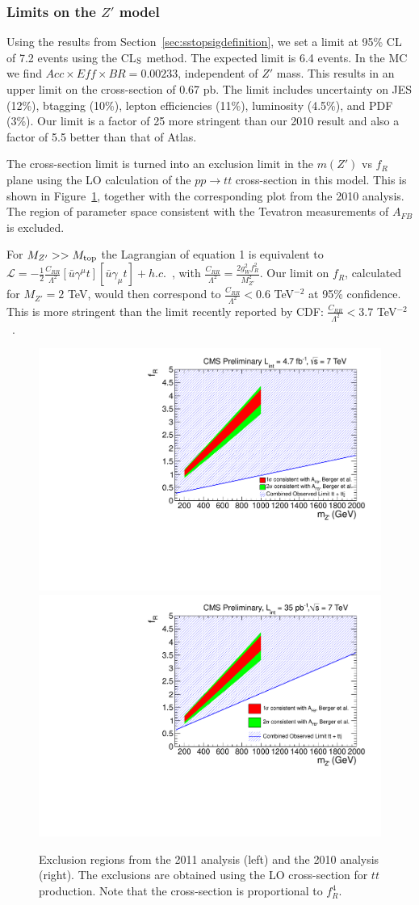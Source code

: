 \subsubsection{Limits on the $Z'$ model}
\label{sec:sstopslimits}
Using the results from Section~\ref{sec:sstopsigdefinition}, we set 
a limit at 95\% CL of 7.2 events using the CL$_{\rm S}$ method.
The expected limit is 6.4 events.
In the MC we find $Acc \times Eff \times BR = 0.00233$, independent of $Z'$ mass. 
This results in an upper limit on the cross-section of 0.67 pb.
The limit includes uncertainty
on JES (12\%), btagging (10\%), lepton efficiencies (11\%), luminosity (4.5\%),
and PDF (3\%).
Our limit is a factor of 25 more stringent than our
2010 result\cite{sstop} and also a factor of 5.5 better
than that of Atlas\cite{sstopatlas}.

The cross-section limit is turned into an exclusion limit in the $m(Z')$ vs $f_R$
plane using the LO calculation of the $pp \to tt$ cross-section in this model.
This is shown in Figure~\ref{fig:sstopexclusion}, together with the corresponding
plot from the 2010 analysis.  The region of parameter space consistent 
with the Tevatron measurements of $A_{FB}$ is excluded.


For $M_{Z'} >> M_{\rm top}$ the Lagrangian of equation 1 is 
equivalent to 
$\mathcal{L} = -\frac{1}{2}\frac{C_{RR}}{\Lambda^2}
 [\bar{u} \gamma^\mu t][\bar{u} \gamma_{\mu} t] + h.c.$~\cite{cdfth2},
with $\frac{C_{RR}}{\Lambda^2} = \frac{2 g_W^2 f_R^2}{M_{Z'}^2}$.
 Our limit on $f_R$, calculated for $M_{Z'}=2$ TeV, 
would then correspond to $\frac{C_{RR}}{\Lambda^2} < 0.6$ TeV$^{-2}$ at 
95\% confidence.  This is more stringent than the limit recently reported
by CDF: $\frac{C_{RR}}{\Lambda^2} < 3.7$ TeV$^{-2}$~\cite{cdflimit}.


\begin{figure}[htb]
\begin{center}
\includegraphics[width=0.45\linewidth]{figs/zprimecombined.pdf}
\includegraphics[width=0.45\linewidth]{figs/sscomb.pdf}
\caption{Exclusion regions from the 2011 analysis (left) and the 2010 analysis (right).
The exclusions are obtained using the LO cross-section for $tt$ production.  
Note that the cross-section is proportional to $f_R^4$.
\label{fig:sstopexclusion}}
\end{center}
\end{figure}

